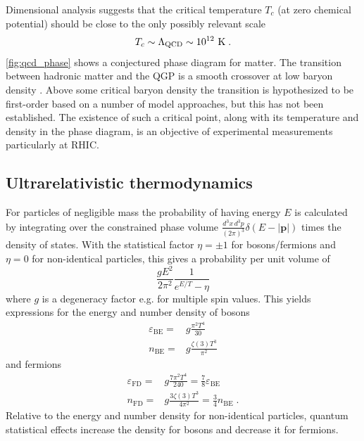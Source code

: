 Dimensional analysis suggests that the critical temperature $T_c$ (at zero chemical potential) should be close to the only possibly relevant scale
\[
T_c \sim \Lambda_\textrm{QCD} \sim 10^{12}~\mathrm{K}\; .
\]
\cref{fig:qcd_phase} shows a conjectured phase diagram for \qcd matter.
The transition between hadronic matter and the QGP is a smooth crossover at low baryon density \cite{Aoki:2006we}.
Above some critical baryon density the transition is hypothesized to be first-order based on a number of model approaches, but this has not been established.
The existence of such a critical point, along with its temperature and density in the phase diagram, is an objective of experimental measurements particularly at \ac{RHIC}.

\subsection{Ultrarelativistic thermodynamics}
For particles of negligible mass the probability of having energy $E$ is calculated by integrating over the constrained phase volume \( \frac{d^3 x \, d^3 p}{(2\pi)^3} \delta\left( E - |\mathbf{p}|\right)\) times the density of states.
With the statistical factor $\eta=\pm1$ for bosons/fermions and $\eta=0$ for non-identical particles, this gives a probability per unit volume of
\begin{equation}
\frac{g E^2}{2\pi^2} \frac{1}{e^{E/T} - \eta}
\end{equation}
where $g$ is a degeneracy factor e.g. for multiple spin values.
This yields expressions for the energy and number density of bosons
\begin{align}
  \varepsilon_\textrm{BE} =& g\frac{\pi^2 T^4}{30} \\
  n_\textrm{BE} =& g\frac{\zeta(3) T^3}{\pi^2}
\end{align}
and fermions
\begin{align}
  \varepsilon_\textrm{FD} =& g\frac{7 \pi^2 T^4}{240} = \frac{7}{8} \varepsilon_\textrm{BE} \\
  n_\textrm{FD} =& g\frac{3 \zeta(3) T^3}{4 \pi^2} = \frac{3}{4} n_\textrm{BE} \; .
\end{align}
Relative to the energy and number density for non-identical particles, quantum statistical effects increase the density for bosons and decrease it for fermions.

